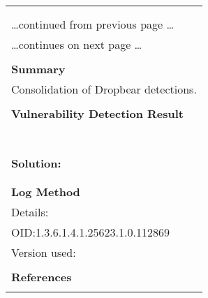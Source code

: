 \documentclass{article}
\begin{document}
\begin{longtable}{|p{}|}
\hline
\rowcolor{gvm_log}{\color{white}{Log (CVSS: 0.0) }}\\
\rowcolor{gvm_log}{\color{white}{NVT: Dropbear Detection Consolidation}}\\
\hline
\endfirsthead
\hfill\ldots continued from previous page \ldots \\
\hline
\endhead
\hline
\ldots continues on next page \ldots \\
\endfoot
\hline
\endlastfoot
\\
\textbf{Summary}\\
Consolidation of Dropbear detections.\\

        \hline
        \\
\textbf{Vulnerability Detection Result}\\
\rowcolor{white}{\verb=Detected Dropbear SSH=}\\
\rowcolor{white}{\verb=Version:       2016.74=}\\
\rowcolor{white}{\verb=Location:      22/tcp=}\\
\rowcolor{white}{\verb=CPE:           cpe:/a:dropbear_ssh_project:dropbear_ssh:2016.74=}\\
\rowcolor{white}{\verb=Concluded from version/product identification result:=}\\
\rowcolor{white}{\verb=SSH-2.0-dropbear_2016.74=}\\

          \hline
          \\
\textbf{Solution:}\\
\\


        \hline
        \\
\textbf{Log Method}\\
Details:
\rowcolor{white}{\verb=Dropbear Detection Consolidation=}\\
OID:1.3.6.1.4.1.25623.1.0.112869\\
Version used:
\rowcolor{white}{\verb=2021-11-10T06:44:11Z=}\\

      \hline
      \\
\textbf{References}\\
\rowcolor{white}{\verb=url: https://matt.ucc.asn.au/dropbear/dropbear.html=}\\
\end{longtable}
\end{document}

